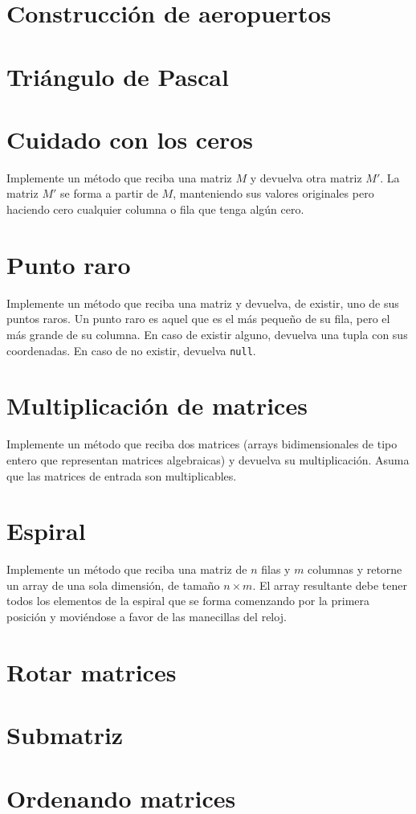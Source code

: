 \section{Construcción de aeropuertos}


\section{Triángulo de Pascal}


\section{Cuidado con los ceros}
Implemente un método que reciba una matriz \(M\) y devuelva otra matriz \(M'\). La matriz \(M'\) se forma a partir de \(M\), manteniendo sus valores originales pero haciendo cero cualquier columna o fila que tenga algún cero.

\section{Punto raro} 
Implemente un método que reciba una matriz y devuelva, de existir, uno de sus puntos raros. Un punto raro es aquel que es el más pequeño de su fila, pero el más grande de su columna. En caso de existir alguno, devuelva una tupla con sus coordenadas. En caso de no existir, devuelva \texttt{null}.	

\section{Multiplicación de matrices}
Implemente un método que reciba dos matrices (arrays bidimensionales de tipo entero que representan matrices algebraicas) y devuelva su multiplicación. Asuma que las matrices de entrada son multiplicables.

\section{Espiral}
Implemente un método que reciba una matriz de \(n\) filas y \(m\) columnas y retorne un array de una sola dimensión, de tamaño \(n \times m\). El array resultante debe tener todos los elementos de la espiral que se forma comenzando por la primera posición y moviéndose a favor de las manecillas del reloj.

\section{Rotar matrices}


\section{Submatriz}


\section{Ordenando matrices}
